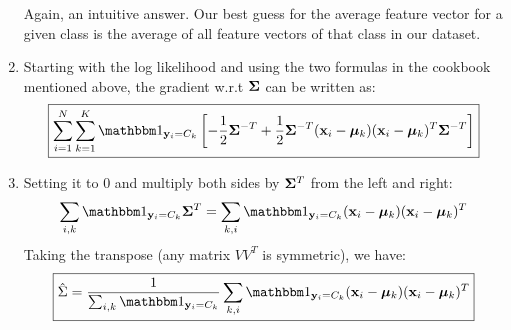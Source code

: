 \documentclass[submit]{harvardml}
\begin{document}
\begin{enumerate}
            Again, an intuitive answer. Our best guess for the average feature vector for a given class is the average of all feature vectors of that class in our dataset.


            \item
            Starting with the log likelihood and using the two formulas in the cookbook mentioned above, the gradient w.r.t $\mathbf{\Sigma}$
            can be written as:
            $$\boxed{\sum_{i=1}^N \sum_{k=1}^K \yickindicator \left[ - \frac{1}{2}\bSigma^{-T} +
            \frac{1}{2} \bSigma^{-T} (\mathbf{x}_i - \bmu_k) (\mathbf{x}_i - \bmu_k)^T
            \bSigma^{-T}\right]}$$


            \item

            Setting it to $0$ and multiply both sides by $\mathbf{\Sigma}^{T}$ from the left and
            right:
            $$\sum_{i, k} \yickindicator \bSigma^T = \sum_{k, i} \yickindicator (\mathbf{x}_i -
            \bmu_k) (\mathbf{x}_i - \bmu_k)^T$$
            Taking the transpose (any matrix $VV^T$ is symmetric), we have:
            $$\boxed{\hat \Sigma = \frac{1}{\sum_{i,k} \yickindicator}  \sum_{k, i} \yickindicator (\mathbf{x}_i -
            \bmu_k) (\mathbf{x}_i - \bmu_k)^T}$$


        \end{enumerate}
\end{document}
